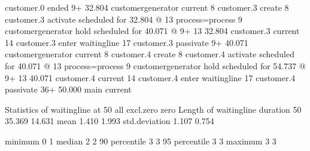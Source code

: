 \documentclass[letterpaper,10pt,english]{sphinxmanual}
\begin{document}
\begin{sphinxVerbatim}[commandchars=\\\{\}]
                                        customer.0 ended
    9+      32.804 customergenerator    current
    8                                   customer.3 create
    8                                   customer.3 activate                  scheduled for     32.804 @   13  process=process
    9                                   customergenerator hold               scheduled for     40.071 @    9+
   13       32.804 customer.3           current
   14                                   customer.3                           enter waitingline
   17                                   customer.3 passivate
    9+      40.071 customergenerator    current
    8                                   customer.4 create
    8                                   customer.4 activate                  scheduled for     40.071 @   13  process=process
    9                                   customergenerator hold               scheduled for     54.737 @    9+
   13       40.071 customer.4           current
   14                                   customer.4                           enter waitingline
   17                                   customer.4 passivate
   36+      50.000 main                 current

Statistics of waitingline at        50
                                                                     all    excl.zero         zero
\PYGZhy{}\PYGZhy{}\PYGZhy{}\PYGZhy{}\PYGZhy{}\PYGZhy{}\PYGZhy{}\PYGZhy{}\PYGZhy{}\PYGZhy{}\PYGZhy{}\PYGZhy{}\PYGZhy{}\PYGZhy{}\PYGZhy{}\PYGZhy{}\PYGZhy{}\PYGZhy{}\PYGZhy{}\PYGZhy{}\PYGZhy{}\PYGZhy{}\PYGZhy{}\PYGZhy{}\PYGZhy{}\PYGZhy{}\PYGZhy{}\PYGZhy{}\PYGZhy{}\PYGZhy{}\PYGZhy{}\PYGZhy{}\PYGZhy{}\PYGZhy{}\PYGZhy{}\PYGZhy{}\PYGZhy{}\PYGZhy{}\PYGZhy{}\PYGZhy{}\PYGZhy{}\PYGZhy{}\PYGZhy{}\PYGZhy{} \PYGZhy{}\PYGZhy{}\PYGZhy{}\PYGZhy{}\PYGZhy{}\PYGZhy{}\PYGZhy{}\PYGZhy{}\PYGZhy{}\PYGZhy{}\PYGZhy{}\PYGZhy{}\PYGZhy{}\PYGZhy{} \PYGZhy{}\PYGZhy{}\PYGZhy{}\PYGZhy{}\PYGZhy{}\PYGZhy{}\PYGZhy{}\PYGZhy{}\PYGZhy{}\PYGZhy{}\PYGZhy{}\PYGZhy{} \PYGZhy{}\PYGZhy{}\PYGZhy{}\PYGZhy{}\PYGZhy{}\PYGZhy{}\PYGZhy{}\PYGZhy{}\PYGZhy{}\PYGZhy{}\PYGZhy{}\PYGZhy{} \PYGZhy{}\PYGZhy{}\PYGZhy{}\PYGZhy{}\PYGZhy{}\PYGZhy{}\PYGZhy{}\PYGZhy{}\PYGZhy{}\PYGZhy{}\PYGZhy{}\PYGZhy{}
Length of waitingline                        duration             50           35.369       14.631
                                             mean                  1.410        1.993
                                             std.deviation         1.107        0.754

                                             minimum               0            1
                                             median                2            2
                                             90\PYGZpc{} percentile        3            3
                                             95\PYGZpc{} percentile        3            3
                                             maximum               3            3


\end{sphinxVerbatim}
\end{document}
